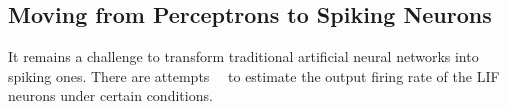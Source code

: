 \documentclass[journal]{journal}
\def\D{\mathrm{d}}
\begin{document}
\subsection{Moving from Perceptrons to Spiking Neurons}
It remains a challenge to transform traditional artificial neural networks into spiking ones.
There are attempts~\cite{la2008response}~\cite{burkitt2006review} to estimate the output firing rate of the LIF neurons under certain conditions. 
%
\end{document}
